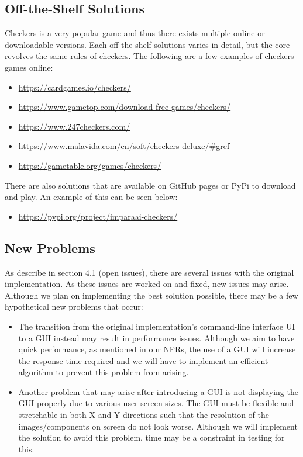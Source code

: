 \documentclass[12pt, titlepage]{article}
\begin{document}
\subsection{Off-the-Shelf Solutions}
Checkers is a very popular game and thus there exists multiple online or downloadable versions. Each off-the-shelf solutions varies in detail, but the core revolves the same rules of checkers. The following are a few examples of checkers games online:
\begin{itemize}
    \item \href{https://cardgames.io/checkers/}{https://cardgames.io/checkers/}
    \item \href{https://www.gametop.com/download-free-games/checkers/}{https://www.gametop.com/download-free-games/checkers/}
    \item \href{https://www.247checkers.com/}{https://www.247checkers.com/}
    \item \href{https://www.malavida.com/en/soft/checkers-deluxe/#gref}{https://www.malavida.com/en/soft/checkers-deluxe/#gref}
    \item \href{https://gametable.org/games/checkers/}{https://gametable.org/games/checkers/}
\end{itemize}
There are also solutions that are available on GitHub pages or PyPi to download and play. An example of this can be seen below:
\begin{itemize}
    \item \href{https://pypi.org/project/imparaai-checkers/}{https://pypi.org/project/imparaai-checkers/}
\end{itemize}
\subsection{New Problems}
As describe in section 4.1 (open issues), there are several issues with the original implementation. As these issues are worked on and fixed, new issues may arise. Although we plan on implementing the best solution possible, there may be a few hypothetical new problems that occur:
\begin{itemize}
    \item The transition from the original implementation's command-line interface UI to a GUI instead may result in performance issues. Although we aim to have quick performance, as mentioned in our NFRs, the use of a GUI will increase the response time required and we will have to implement an efficient algorithm to prevent this  problem from arising.
    \item Another problem that may arise after introducing a GUI is not displaying the GUI properly due to various user screen sizes. The GUI must be flexible and stretchable in both X and Y directions such that the resolution of the images/components on screen do not look worse. Although we will implement the solution to avoid this problem, time may be a constraint in testing for this.
\end{itemize}
\end{document}
